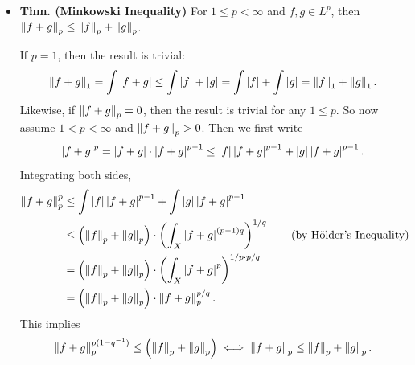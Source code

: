 \documentclass{article}
\begin{document}
\begin{itemize}
\begin{solutions}
			\begin{equation}
				\abs{fg} \leq p^{-1}\abs{f}^{p} + q^{-1}\abs{g}.
			\end{equation}	
		Integrating both sides, one obtains 
			\begin{equation}
				\norm{fg}_{1} \leq  p^{-1}\norm{f}_{p} + q^{-1}\norm{g}_{q} = p^{-1} + q^{-1} = 1 = \norm{f}_{p}\norm{g}_{q}. 
			\end{equation}
		Equality holds here iff equality holds in H\"older's lemma; i.e., $|f|^{p} = |q|^{q}$ $\mu$-a.e. 
	\end{solutions}
	\item \textbf{Thm. (Minkowski Inequality)} For $1 \leq p < \infty$ and $f, g \in L^{p}$, then $\left\Vert f + g \right\Vert_{p}\leq \left\Vert f \right\Vert_{p} + \left\Vert g \right\Vert_{p}$. \newline 
	\begin{solutions} 
		If $p = 1$, then the result is trivial: 
		\begin{equation}
			\left\Vert f + g \right\Vert_{1} = \int \left| f + g \right| \leq \int \left| f \right| + \left| g \right| = \int \left| f \right| + \int \left| g \right| = \left\Vert f \right\Vert_{1} + \left\Vert g \right\Vert_{1}. 
		\end{equation}
	Likewise, if $\left\Vert f + g \right\Vert_{p} =0$, then the result is trivial for any $1 \leq p$. So now assume $1 < p < \infty$ and $\left\Vert f + g \right\Vert_{p} > 0$. Then we first write 
		\begin{equation}
			\left| f + g \right|^{p} = \left| f + g \right| \cdot \left| f + g \right|^{p -1} \leq \left| f \right|\left| f + g \right|^{p - 1} + \left| g \right|\left| f + g \right|^{p - 1}. 
		\end{equation}
	Integrating both sides, 
		\begin{align}
			\begin{split}
				\left\Vert f + g \right\Vert^{p}_{p} &\leq \int \left| f \right|\left| f + g \right|^{p - 1} + \int \left| g \right|\left| f + g \right|^{p - 1} \\
				&\leq \left(\left\Vert f \right\Vert_{p} + \left\Vert g \right\Vert_{p}\right) \cdot \left(\int_{X}\left| f + g \right|^{(p - 1)q}\right)^{1/q} \qquad \text{(by H\"older's Inequality)} \\
				&= \left(\left\Vert f \right\Vert_{p} + \left\Vert g \right\Vert_{p}\right) \cdot \left(\int_{X}\left| f + g \right|^{p}\right)^{1/p\cdot p/q} \\
				&= \left(\left\Vert f \right\Vert_{p} + \left\Vert g \right\Vert_{p}\right) \cdot \left\Vert f + g \right\Vert_{p}^{p/q}. 
 			\end{split}
		\end{align}
	This implies 
		\begin{equation}
			\norm{f + g}_{p}^{p(1 - q^{-1})} \leq \left(\norm{f}_{p} + \norm{g}_{p}\right) \iff \norm{f + g}_{p} \leq \norm{f}_{p} + \norm{g}_{p}.

\end{equation}
\end{solutions}
\end{itemize}
\end{document}
